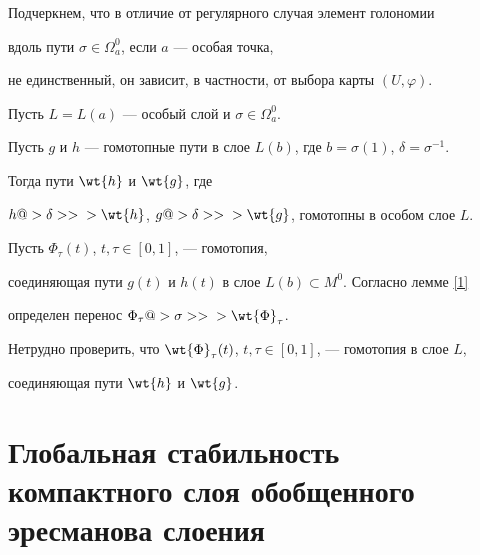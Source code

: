 




\begin{note} Подчеркнем, что в отличие от регулярного случая элемент голономии


вдоль пути $\sigma\in\Omega^0_a$, если $a$ --- особая точка,


не единственный, он зависит, в частности, от выбора карты $(U,\varphi)$.


\end{note}





\begin{lem}\label{4}


Пусть $L=L(a)$ --- особый слой и $\sigma\in\Omega^0_a$.


Пусть $g$ и $h$ --- гомотопные пути в слое $L(b)$, где $b=\sigma(1)$, $\delta=\sigma^{-1}$.


Тогда пути $\wt{h}$ и $\wt{g}$, где


$h@> {\delta}>>{} >\wt{h}$, $g@> {\delta}>>{}


>\wt{g}$, гомотопны в особом слое $L$.


\end{lem}





\begin{pf}


Пусть $\Phi_{\tau}(t)$, $t,\tau\in[0,1]$, --- гомотопия,


соединяющая пути $g(t)$ и $h(t)$ в слое $L(b)\subset M^0$. Согласно лемме \ref{1}


определен перенос $\Phi_{\tau}@> {\sigma}>>{} >\wt{\Phi}_{\tau}$.


Нетрудно проверить, что $\wt{\Phi}_{\tau}(t)$, $t,\tau\in[0,1]$, --- гомотопия в слое $L$,


соединяющая пути $\wt{h}$ и $\wt{g}$.


\end{pf}








\section{Глобальная стабильность компактного слоя обобщенного эресманова слоения}








